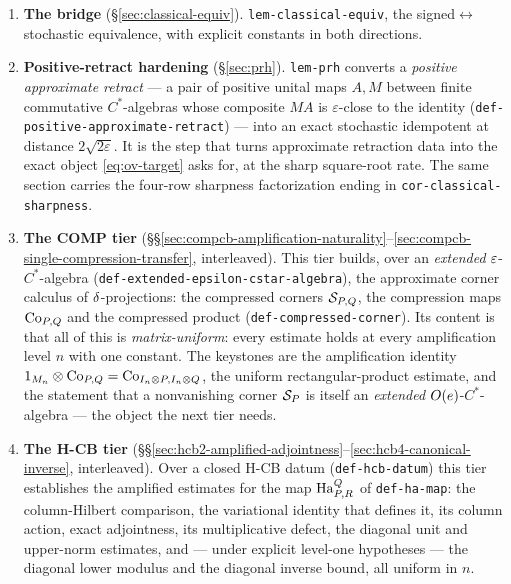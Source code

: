 \begin{enumerate}
\item \textbf{The bridge} (\S\ref{sec:classical-equiv}). \texttt{lem-classical-equiv},
  the signed$\leftrightarrow$stochastic equivalence, with explicit constants in both
  directions.

\item \textbf{Positive-retract hardening} (\S\ref{sec:prh}). \texttt{lem-prh} converts a
  \emph{positive approximate retract} --- a pair of positive unital maps $A,M$ between
  finite commutative $C^*$-algebras whose composite $MA$ is $\varepsilon$-close to the
  identity (\texttt{def-positive-approximate-retract}) --- into an exact stochastic
  idempotent at distance $2\sqrt{2\varepsilon}$. It is the step that turns approximate
  retraction data into the exact object \eqref{eq:ov-target} asks for, at the sharp
  square-root rate. The same section carries the four-row sharpness factorization
  ending in \texttt{cor-classical-sharpness}.

\item \textbf{The COMP tier} (\S\S\ref{sec:compcb-amplification-naturality}--\ref{sec:compcb-single-compression-transfer},
  interleaved). This tier builds, over an \emph{extended} $\varepsilon$-$C^*$-algebra
  (\texttt{def-extended-epsilon-cstar-algebra}), the approximate corner calculus of
  $\delta$-projections: the compressed corners $\mathcal S_{P,Q}$, the compression maps
  $\mathrm{Co}_{P,Q}$ and the compressed product (\texttt{def-compressed-corner}). Its content
  is that all of this is \emph{matrix-uniform}: every estimate holds at every
  amplification level $n$ with one constant. The keystones are the amplification
  identity $1_{M_{n}}\otimes\mathrm{Co}_{P,Q}=\mathrm{Co}_{I_{n}\otimes P,I_{n}\otimes Q}$, the uniform
  rectangular-product estimate, and the statement that a nonvanishing corner $\mathcal S_{P}$
  is itself an \emph{extended} $O(e)$-$C^*$-algebra --- the object the next tier
  needs.

\item \textbf{The H-CB tier} (\S\S\ref{sec:hcb2-amplified-adjointness}--\ref{sec:hcb4-canonical-inverse},
  interleaved). Over a closed H-CB datum (\texttt{def-hcb-datum}) this tier establishes
  the amplified estimates for the map $\mathrm{Ha}^{Q}_{P,R}$ of \texttt{def-ha-map}: the
  column-Hilbert comparison, the variational identity that defines it, its column
  action, exact adjointness, its multiplicative defect, the diagonal unit and
  upper-norm estimates, and --- under explicit level-one hypotheses --- the diagonal
  lower modulus and the diagonal inverse bound, all uniform in $n$.


\end{enumerate}
